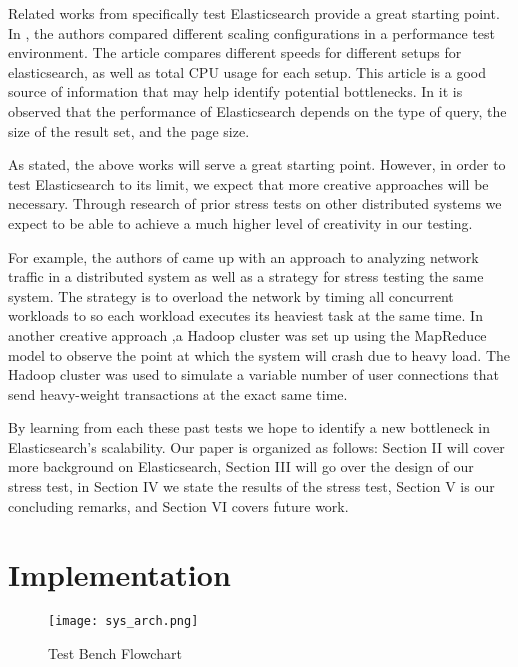 \documentclass[journal]{IEEEtran}
\begin{document}
Related works from \cite{berger_2018,thacker_pandey_rautaray_2016} specifically test Elasticsearch provide a great starting point. In \cite{berger_2018}, the authors compared different scaling configurations in a performance test environment. The article compares different speeds for different setups for elasticsearch, as well as total CPU usage for each setup. This article is a good source of information that may help identify potential bottlenecks. In \cite{thacker_pandey_rautaray_2016} it is observed that the performance of Elasticsearch depends on the type of query, the size of the result set, and the page size.

As stated, the above works will serve a great starting point. However, in order to test Elasticsearch to its limit, we expect that more creative approaches will be necessary. Through research of prior stress tests on other distributed systems we expect to be able to achieve a much higher level of creativity in our testing.

For example, the authors of \cite{garousi_briand_labiche_2006} came up with an approach to analyzing network traffic in a distributed system as well as a strategy for stress testing the same system. The strategy is to overload the network by timing all concurrent workloads to so each workload executes its heaviest task at the same time. In another creative approach \cite{hwang_wu-lee_tung_chuang_wu_2014},a Hadoop cluster was set up using the MapReduce model to observe the point at which the system will crash due to heavy load. The Hadoop cluster was used to simulate a variable number of user connections that send heavy-weight transactions at the exact same time. 

By learning from each these past tests we hope to identify a new bottleneck in Elasticsearch's scalability. Our paper is organized as follows: Section II will cover more background on Elasticsearch, Section III will go over the design of our stress test, in Section IV we state the results of the stress test, Section V is our concluding remarks, and Section VI covers future work.

\section{Implementation}

\begin{figure}
  \centering
  \texttt{[image: sys\_arch.png]}
 \caption{Test Bench Flowchart}
\end{figure}
\end{document}
